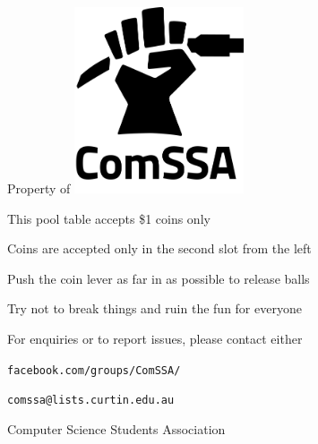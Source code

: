 \documentclass[a4paper]{minimal}
\begin{document}
\fontsize{35.83pt}{1em}
\selectfont

\begin{center}
	Property of
	\hspace{1cm}
	\raisebox{-.5\height}
	{\includegraphics[width=5cm]{logo/comssalogo_black_large.png}}
\end{center}

\fontsize{24.88pt}{1.1em}
\selectfont

\begin{list}{\textbullet\hspace{0.5em}}{}
	\item This pool table accepts \$1 coins only
	\item Coins are accepted only in the second slot from the left
	\item Push the coin lever as far in as possible to release balls
	\item Try not to break things and ruin the fun for everyone
	\item For enquiries or to report issues, please contact either
	\begin{list}{\hspace{1.5em}\textbullet\hspace{0.5em}}{}
		\item \texttt{facebook.com/groups/ComSSA/}
		\item \texttt{comssa@lists.curtin.edu.au}
	\end{list}
\end{list}

\fontsize{12pt}{1em}
\selectfont

\begin{center}
	Computer Science Students Association
\end{center}
\end{document}
